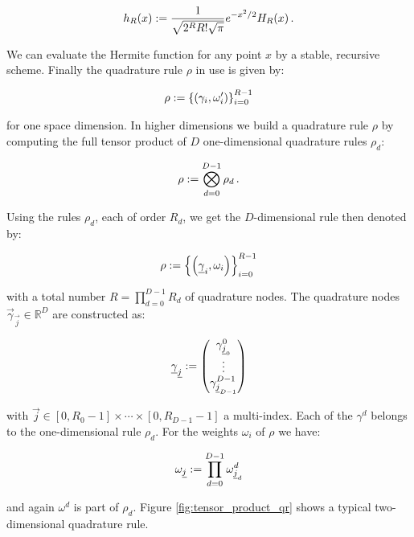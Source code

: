 \begin{equation*}
  h_R(x) := \frac{1}{\sqrt{2^R R! \sqrt{\pi}}} e^{-x^2/2} H_R(x) \,.
\end{equation*}

We can evaluate the Hermite function for any point $x$ by a stable,
recursive scheme. Finally the quadrature rule $\rho$ in use is
given by:

\begin{equation}
  \rho := \left\{\left(\gamma_i, \omega_i^\prime\right)\right\}_{i=0}^{R-1}
\end{equation}

for one space dimension. In higher dimensions we build a quadrature
rule $\rho$ by computing the full tensor product of $D$ one-dimensional
quadrature rules $\rho_d$:

\begin{equation}
  \rho := \bigotimes_{d=0}^{D-1} \rho_d \,.
\end{equation}

Using the rules $\rho_d$, each of order $R_d$, we get the $D$-dimensional
rule then denoted by:

\begin{equation}
  \rho := \left\{ \left( \underline{\gamma}_i, \omega_i \right) \right\}_{i=0}^{R-1}
\end{equation}

with a total number $R = \prod_{d=0}^{D-1} R_d$ of quadrature nodes. The quadrature
nodes $\vec{\gamma}_{\vec{j}} \in \mathbb{R}^D$ are constructed as:

\begin{equation*}
  \underline{\gamma}_{\underline{j}}
  :=
  \begin{pmatrix}
    \gamma^0_{\underline{j}_0} \\
    \vdots \\
    \gamma^{D-1}_{\underline{j}_{D-1}}
  \end{pmatrix}
\end{equation*}

with $\vec{j} \in [0,R_0-1] \times \cdots \times [0,R_{D-1}-1]$ a multi-index.
Each of the $\gamma^d$ belongs to the one-dimensional rule $\rho_d$. For the
weights $\omega_i$ of $\rho$ we have:

\begin{equation*}
  \omega_{\underline{j}} := \prod_{d=0}^{D-1} \omega^d_{\underline{j}_d}
\end{equation*}

and again $\omega^d$ is part of $\rho_d$. Figure \ref{fig:tensor_product_qr}
shows a typical two-dimensional quadrature rule.

